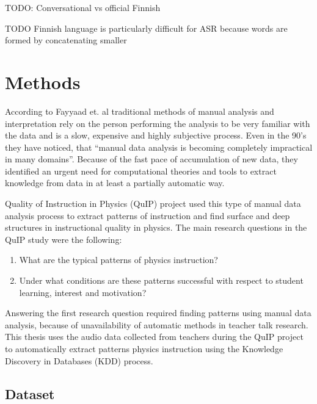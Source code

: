 \documentclass[utf8,english]{gradu3}
\begin{document}
TODO: Conversational vs official Finnish

TODO Finnish language is particularly difficult for ASR because words are formed by concatenating smaller \parencite{enarviModelingConversationalFinnish2018}



\chapter{Methods}

According to Fayyaad et. al \parencite*{fayyadDataMiningKnowledge1996} traditional methods of manual analysis and interpretation rely on the person performing the analysis to be very familiar with the data and is a slow, expensive and highly subjective process. Even in the 90's they have noticed, that \enquote{manual data analysis is becoming completely impractical in many domains}. Because of the fast pace of accumulation of new data, they identified an urgent need for computational theories and tools to extract knowledge from data in at least a partially automatic way.

Quality of Instruction in Physics (QuIP) project \parencite{fischerQualityInstructionPhysics2014} used this type of manual data analysis process to extract patterns of instruction and find surface and deep structures in instructional quality in physics. The main research questions in the QuIP study were the following:

\begin{enumerate}
 \item What are the typical patterns of physics instruction?
 \item Under what conditions are these patterns successful with respect to student learning, interest and motivation?
\end{enumerate}

Answering the first research question required finding patterns using manual data analysis, because of unavailability of automatic methods in teacher talk research. This thesis uses the audio data collected from teachers during the QuIP project to automatically extract patterns physics instruction using the Knowledge Discovery in Databases (KDD) process.

\section{Dataset}
\end{document}
